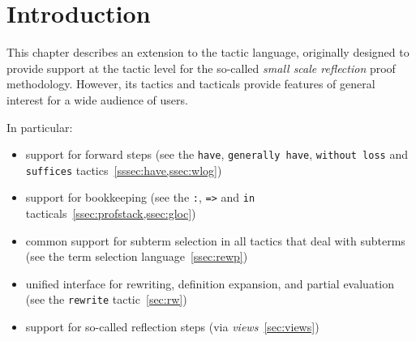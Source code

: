 
\newcommand{\ssr}{{\sc SSReflect}}

\ifhevea\newcommand{\ssrC}[1]{\texttt{#1}}\else\newcommand{\ssrC}[1]{\text{\lstinline!#1!}}\fi
\ifhevea\renewenvironment{center}{\@open{div}{class="center"}\@open{div}{class="centered"}}{\@close{div}\@close{div}}\fi
\newcommand\ssrN[2][]{{\textsl {#2}}\ensuremath{_{#1}}}
\ifhevea\newcommand{\underbar}[1]{\underline{#1}}\fi

\let\ssrL=\lstinline

\newcommand{\iitem}{{\it i-item}}
\newcommand{\ditem}{{\it d-item}}
\newcommand{\optional}[1]{{\it[}#1{\it]}}
\newcommand{\optsep}{{\it|}}
\newcommand{\idx}[1]{\tacindex{#1 (ssreflect)}}
\newcommand{\idxC}[1]{\comindex{#1 (ssreflect)}}

\newenvironment{new}%
  {\begin{Sbox}\begin{minipage}{0.97\textwidth}%
    \begin{flushright}\textcolor{red}{\fbox{Version 1.3}}%
      \end{flushright}\noindent}%
  {\end{minipage}\end{Sbox}\noindent\doublebox{\TheSbox}}
\section{Introduction}\label{sec:intro}

This chapter describes an extension to the \Coq{} tactic language,
originally designed to provide support at the tactic level for the
so-called \emph{small scale reflection} proof methodology.
However, its tactics and tacticals
provide features of general interest for a wide audience of users.

In particular:
\begin{itemize}
\item support for forward steps (see the \ssrC{have}, \ssrC{generally have}, \ssrC{without loss} and \ssrC{suffices} tactics~\ref{sssec:have,ssec:wlog})
\item support for bookkeeping (see the \ssrC{:}, \ssrC{=>} and \ssrC{in} tacticals~\ref{ssec:profstack,ssec:gloc})
\item common support for subterm selection in all tactics that deal with subterms
	(see the term selection language~\ref{ssec:rewp})
\item unified interface for rewriting, definition expansion, and
	partial evaluation (see the \ssrC{rewrite} tactic~\ref{sec:rw})
\item support for so-called reflection steps (via \emph{views}~\ref{sec:views})
\end{itemize}

